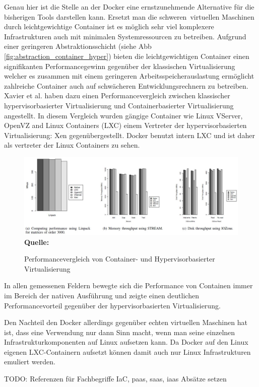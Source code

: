 Genau hier ist die Stelle an der Docker eine ernstzunehmende Alternative für die bisherigen Tools darstellen kann. Ersetzt man die \grq schweren\grq\ virtuellen Maschinen durch leichtgewichtige Container ist es möglich sehr viel komplexere Infrastrukturen auch mit minimalen Systemressourcen zu betreiben.
Aufgrund einer geringeren Abstraktionsschicht (siehe Abb \ref{fig:abstraction_container_hyper}) bieten die leichtgewichtigen Container einen signifikanten Performancegewinn gegenüber der klassischen Virtualisierung welcher es zusammen mit einem geringeren Arbeitsspeicherauslastung ermöglicht zahlreiche Container auch auf schwächeren Entwicklungsrechnern zu betreiben.
Xavier et al. \cite{miguel_g._xavier_performance_????} haben dazu einen Performancevergleich zwischen klassischer hypervisorbasierter Virtualisierung und Containerbasierter Virtualisierung angestellt.
In diesem Vergleich wurden gängige Container  wie Linux VServer, OpenVZ and Linux Containers (LXC) einem Vertreter der hypervisorbasierten Virtualisierung: Xen gegenübergestellt.
Docker benutzt intern LXC und ist daher als vertreter der Linux Containers zu sehen.
\begin{figure}[htbp]
  \centering  
  \includegraphics[scale=0.5]{img/performanceBenchmarks.JPG}\\
  \footnotesize\sffamily\textbf{Quelle:} \cite{miguel_g._xavier_performance_????}
  \caption{Performancevergleich von Container- und Hypervisorbasierter Virtualisierung}
  \label{fig:performance_container_hyper}
\end{figure}
In allen gemessenen Feldern bewegte sich die Performance von Containen immer im Bereich der nativen Ausführung und zeigte einen deutlichen Performancevorteil gegenüber der hypervisorbasierten Virtualisierung. 

Den Nachteil den Docker allerdings gegenüber echten virtuellen Maschinen hat ist, dass eine Verwendung nur dann Sinn macht, wenn man seine einzelnen Infrastrukturkomponenten auf Linux aufsetzen kann. Da Docker auf den Linux eigenen LXC-Containern aufsetzt können damit auch nur Linux Infrastrukturen emuliert werden.

TODO: Referenzen für Fachbegriffe IaC, paas, saas, iaas
Absätze setzen